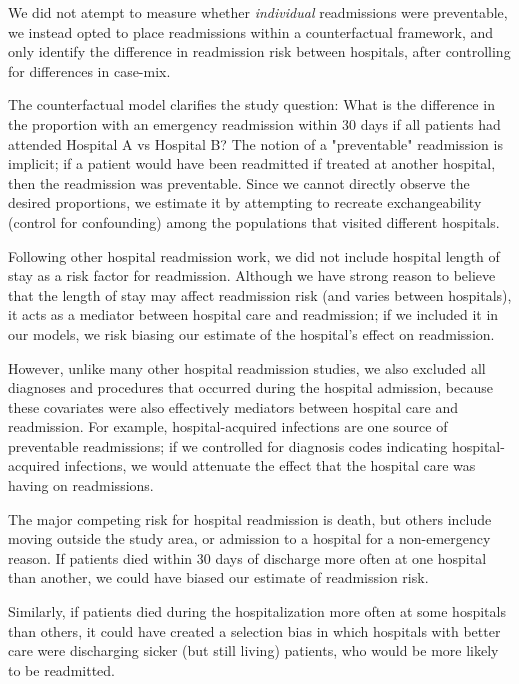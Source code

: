 \documentclass[]{article}\usepackage[]{graphicx}\usepackage[]{color}
\begin{document}
We did not atempt to measure whether \emph{individual} readmissions were preventable, we instead opted to place readmissions within a counterfactual framework, and only identify the difference in readmission risk between hospitals, after controlling for differences in case-mix. 

The counterfactual model clarifies the study question: What is the difference in the proportion with an emergency readmission within 30 days if all patients had attended Hospital A vs Hospital B? The notion of a "preventable" readmission is implicit; if a patient would have been readmitted if treated at another hospital, then the readmission was preventable. Since we cannot directly observe the desired proportions, we estimate it by attempting to recreate exchangeability (control for confounding) among the populations that visited different hospitals.

Following other hospital readmission work, we did not include hospital length of stay as a risk factor for readmission. Although we have strong reason to believe that the length of stay may affect readmission risk (and varies between hospitals), it acts as a mediator between hospital care and readmission; if we included it in our models, we risk biasing our estimate of the hospital's effect on readmission. 

However, unlike many other hospital readmission studies, we also excluded all diagnoses and procedures that occurred during the hospital admission, because these covariates were also effectively mediators between hospital care and readmission. For example, hospital-acquired infections are one source of preventable readmissions; if we controlled for diagnosis codes indicating hospital-acquired infections, we would attenuate the effect that the hospital care was having on readmissions.

The major competing risk for hospital readmission is death, but others include moving outside the study area, or admission to a hospital for a non-emergency reason. If patients died within 30 days of discharge more often at one hospital than another, we could have biased our estimate of readmission risk.

Similarly, if patients died during the hospitalization more often at some hospitals than others, it could have created a selection bias in which hospitals with better care were discharging sicker (but still living) patients, who would be more likely to be readmitted. 
\end{document}
